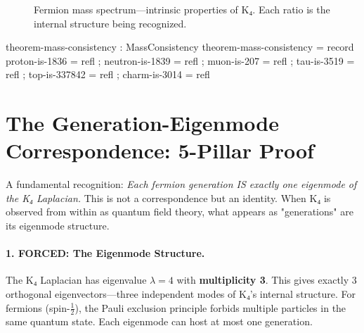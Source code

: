 \documentclass[11pt,a4paper]{book}
\begin{document}
\begin{figure}[h]
\centering
{}
\caption{Fermion mass spectrum—intrinsic properties of K₄. Each ratio is the internal structure being recognized.}
\label{fig:fermion-masses}
\end{figure}

\begin{code}
theorem-mass-consistency : MassConsistency
theorem-mass-consistency = record
  { proton-is-1836   = refl
  ; neutron-is-1839  = refl
  ; muon-is-207      = refl
  ; tau-is-3519      = refl
  ; top-is-337842    = refl
  ; charm-is-3014    = refl
  }
\end{code}

\section{The Generation-Eigenmode Correspondence: 5-Pillar Proof}

A fundamental recognition: \emph{Each fermion generation IS exactly one eigenmode of the K₄ Laplacian.} This is not a correspondence but an identity. When K₄ is observed from within as quantum field theory, what appears as "generations" are its eigenmode structure.

\paragraph{1. FORCED: The Eigenmode Structure.}

The K₄ Laplacian has eigenvalue $\lambda = 4$ with \textbf{multiplicity 3}. This gives exactly 3 orthogonal eigenvectors—three independent modes of K₄'s internal structure. For fermions (spin-$\tfrac{1}{2}$), the Pauli exclusion principle forbids multiple particles in the same quantum state. Each eigenmode can host at most one generation.
\end{document}
